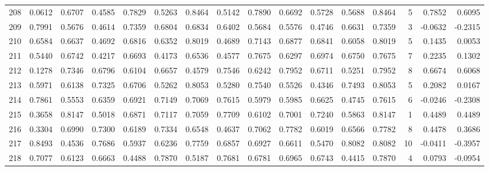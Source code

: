 \begin{tabular}{lrrrrrrrrrrrrrrr}
208 &      0.0612 &  0.6707 &  0.4585 &  0.7829 &  0.5263 &  0.8464 &  0.5142 &  0.7890 &  0.6692 &  0.5728 &   0.5688 &     0.8464 &      5 &                    0.7852 &                     0.6095 \\
209 &      0.7991 &  0.5676 &  0.4614 &  0.7359 &  0.6804 &  0.6834 &  0.6402 &  0.5684 &  0.5576 &  0.4746 &   0.6631 &     0.7359 &      3 &                   -0.0632 &                    -0.2315 \\
210 &      0.6584 &  0.6637 &  0.4692 &  0.6816 &  0.6352 &  0.8019 &  0.4689 &  0.7143 &  0.6877 &  0.6841 &   0.6058 &     0.8019 &      5 &                    0.1435 &                     0.0053 \\
211 &      0.5440 &  0.6742 &  0.4217 &  0.6693 &  0.4173 &  0.6536 &  0.4577 &  0.7675 &  0.6297 &  0.6974 &   0.6750 &     0.7675 &      7 &                    0.2235 &                     0.1302 \\
212 &      0.1278 &  0.7346 &  0.6796 &  0.6104 &  0.6657 &  0.4579 &  0.7546 &  0.6242 &  0.7952 &  0.6711 &   0.5251 &     0.7952 &      8 &                    0.6674 &                     0.6068 \\
213 &      0.5971 &  0.6138 &  0.7325 &  0.6706 &  0.5262 &  0.8053 &  0.5280 &  0.7540 &  0.5526 &  0.4346 &   0.7493 &     0.8053 &      5 &                    0.2082 &                     0.0167 \\
214 &      0.7861 &  0.5553 &  0.6359 &  0.6921 &  0.7149 &  0.7069 &  0.7615 &  0.5979 &  0.5985 &  0.6625 &   0.4745 &     0.7615 &      6 &                   -0.0246 &                    -0.2308 \\
215 &      0.3658 &  0.8147 &  0.5018 &  0.6871 &  0.7117 &  0.7059 &  0.7709 &  0.6102 &  0.7001 &  0.7240 &   0.5863 &     0.8147 &      1 &                    0.4489 &                     0.4489 \\
216 &      0.3304 &  0.6990 &  0.7300 &  0.6189 &  0.7334 &  0.6548 &  0.4637 &  0.7062 &  0.7782 &  0.6019 &   0.6566 &     0.7782 &      8 &                    0.4478 &                     0.3686 \\
217 &      0.8493 &  0.4536 &  0.7686 &  0.5937 &  0.6236 &  0.7759 &  0.6857 &  0.6927 &  0.6611 &  0.5470 &   0.8082 &     0.8082 &     10 &                   -0.0411 &                    -0.3957 \\
218 &      0.7077 &  0.6123 &  0.6663 &  0.4488 &  0.7870 &  0.5187 &  0.7681 &  0.6781 &  0.6965 &  0.6743 &   0.4415 &     0.7870 &      4 &                    0.0793 &                    -0.0954 \\

\end{tabular}
